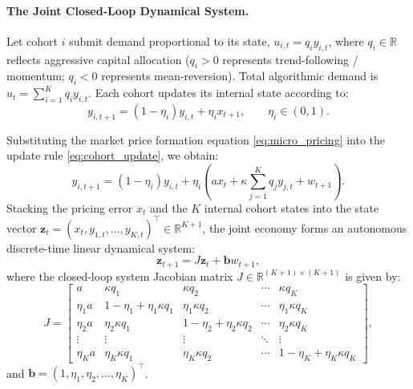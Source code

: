 \documentclass[12pt]{article}
\theoremstyle{definition}
\theoremstyle{remark}
\newcommand{\R}{\mathbb{R}}
\begin{document}
\paragraph{The Joint Closed-Loop Dynamical System.}
Let cohort $i$ submit demand proportional to its state, $u_{i,t} = q_i y_{i,t}$, where $q_i \in \R$ reflects aggressive capital allocation ($q_i > 0$ represents trend-following / momentum; $q_i < 0$ represents mean-reversion). Total algorithmic demand is $u_t = \sum_{i=1}^K q_i y_{i,t}$. Each cohort updates its internal state according to:
\begin{equation}
y_{i, t+1} = (1 - \eta_i) y_{i, t} + \eta_i x_{t+1}, \qquad \eta_i \in (0, 1).
\label{eq:cohort_update}
\end{equation}

Substituting the market price formation equation \eqref{eq:micro_pricing} into the update rule \eqref{eq:cohort_update}, we obtain:
\begin{equation}
y_{i, t+1} = (1 - \eta_i) y_{i, t} + \eta_i \left( a x_t + \kappa \sum_{j=1}^K q_j y_{j, t} + w_{t+1} \right).
\end{equation}
Stacking the pricing error $x_t$ and the $K$ internal cohort states into the state vector $\mathbf{z}_t = (x_t, y_{1,t}, \dots, y_{K,t})^\top \in \R^{K+1}$, the joint economy forms an autonomous discrete-time linear dynamical system:
\begin{equation}
\mathbf{z}_{t+1} = J \mathbf{z}_t + \mathbf{b} w_{t+1},
\label{eq:state_space_system}
\end{equation}
where the closed-loop system Jacobian matrix $J \in \R^{(K+1) \times (K+1)}$ is given by:
\begin{equation}
J = \begin{bmatrix}
a & \kappa q_1 & \kappa q_2 & \cdots & \kappa q_K \\
\eta_1 a & 1 - \eta_1 + \eta_1 \kappa q_1 & \eta_1 \kappa q_2 & \cdots & \eta_1 \kappa q_K \\
\eta_2 a & \eta_2 \kappa q_1 & 1 - \eta_2 + \eta_2 \kappa q_2 & \cdots & \eta_2 \kappa q_K \\
\vdots & \vdots & \vdots & \ddots & \vdots \\
\eta_K a & \eta_K \kappa q_1 & \eta_K \kappa q_2 & \cdots & 1 - \eta_K + \eta_K \kappa q_K
\end{bmatrix},
\label{eq:full_jacobian}
\end{equation}
and $\mathbf{b} = (1, \eta_1, \eta_2, \dots, \eta_K)^\top$.
\end{document}

